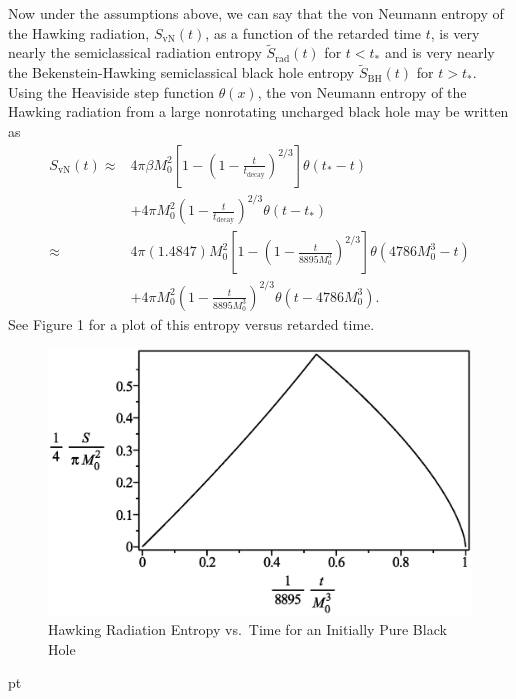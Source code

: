 \documentclass[12pt]{article}
\begin{document}
Now under the assumptions above, we can say that the von Neumann entropy of the Hawking radiation, $S_\mathrm{vN}(t)$, as a function of the retarded time $t$, is very nearly the semiclassical radiation entropy $\tilde{S}_\mathrm{rad}(t)$   for $t < t_\ast$ and is very nearly the Bekenstein-Hawking semiclassical black hole entropy $\tilde{S}_\mathrm{BH}(t)$ for $t > t_\ast$.  Using the Heaviside step function $\theta(x)$, the von Neumann entropy of the Hawking radiation from a large nonrotating uncharged black hole may be written as
\begin{equation}
\begin{split}
S_\mathrm{vN}(t) \approx {} &
4\pi\beta M_0^2\left[1-\left(1-\frac{t}{t_\mathrm{decay}}\right)^{2/3}\right]
\theta(t_\ast - t) \\ 
& +4\pi M_0^2\left(1-\frac{t}{t_\mathrm{decay}}\right)^{2/3}\theta(t - t_\ast)
\\
\approx {} &
4\pi(1.4847)M_0^2\left[1-\left(1-\frac{t}{8895 M_0^3}\right)^{2/3}\right]
\theta(4786M_0^3 - t)
\\
& +4\pi M_0^2\left(1-\frac{t}{8895 M_0^3}\right)^{2/3}
\theta(t - 4786 M_0^3). 
\label{rad-von-Neumann-entropy-evolution}
\end{split}
\end{equation}
See Figure 1 for a plot of this entropy versus retarded time.


\begin{figure}[H]
\centering
\includegraphics[scale=.75]
{Hawking-radiation-entropy-vs-time-graph-10f-is-0.eps}
\caption{Hawking Radiation Entropy vs.\ Time for an Initially Pure Black Hole}
\end{figure}


\newpage
{} pt
\end{document}
